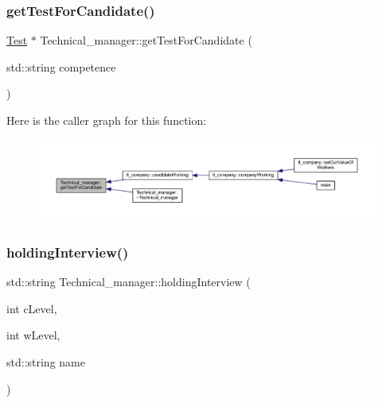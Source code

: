 \hypertarget{class_technical__manager_acee4360da537c12e758574e58c33481d}{}\label{class_technical__manager_acee4360da537c12e758574e58c33481d} 
\subsubsection{\texorpdfstring{get\+Test\+For\+Candidate()}{getTestForCandidate()}}
{\footnotesize\ttfamily \hyperlink{class_test}{Test} $\ast$ Technical\+\_\+manager\+::get\+Test\+For\+Candidate (\begin{DoxyParamCaption}\item[{std\+::string}]{competence }\end{DoxyParamCaption})}

Here is the caller graph for this function\+:
\nopagebreak
\begin{figure}[H]
\begin{center}
\leavevmode
\includegraphics[width=350pt]{class_technical__manager_acee4360da537c12e758574e58c33481d_icgraph}
\end{center}
\end{figure}
\hypertarget{class_technical__manager_a3e52c05a672894682cf2d4ab69664c1e}{}\label{class_technical__manager_a3e52c05a672894682cf2d4ab69664c1e} 
\subsubsection{\texorpdfstring{holding\+Interview()}{holdingInterview()}}
{\footnotesize\ttfamily std\+::string Technical\+\_\+manager\+::holding\+Interview (\begin{DoxyParamCaption}\item[{int}]{c\+Level,  }\item[{int}]{w\+Level,  }\item[{std\+::string}]{name }\end{DoxyParamCaption})}

